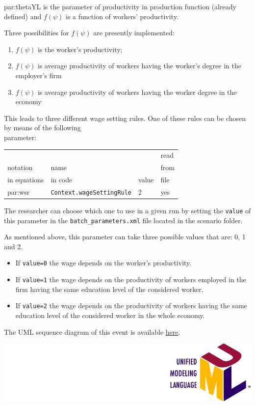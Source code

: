 \documentclass{book}
\newcommand{\doclocation}{file:///Users/giulioni/Documents/workspace/gabriele/docs}
\begin{document}
\vskip2mm
\gls{par:thetaYL} is the parameter of productivity in production function (already defined) and $f(\psi)$ is a function of workers' productivity.

Three possibilities for $f(\psi)$ are presently implemented:
\begin{enumerate}
	\item $f(\psi)$ is the worker's productivity;
	\item $f(\psi)$ is average productivity of workers having the worker's degree in the employer's firm
	\item $f(\psi)$ is average productivity of workers having the worker degree in the economy
\end{enumerate}


This leads to three different wage setting rules. One of these rules can be chosen by means of the following\\
parameter:\\
\vskip2mm
\noindent
\begin{tabular}{l l l l}
	\hline
	& &&read\\
	notation& name &&from\\
	in equations& in code&value&file\\
	\hline
	\hline
\gls{par:wsr}&\verb+Context.wageSettingRule+&2&yes\\
	\hline
\end{tabular}

\vskip2mm
The researcher can choose which one to use in a given run by setting the \verb+value+ of this parameter in the \verb+batch_parameters.xml+ file located in the scenario folder.

As mentioned above, this parameter can take three possible values that are: 0, 1 and 2.

\begin{itemize}
	\item 
		If \verb+value=0+ the wage depends on the worker's productivity.
	\item 
		If \verb+value=1+ the wage depends on the productivity of workers employed in the firm having the same education level of the considered worker.
	\item 
		If \verb+value=2+ the wage depends on the productivity of workers having the same education level of the considered worker in the whole economy.

\end{itemize}

The UML sequence diagram of this event is available \href{\doclocation/umldoc/setWorkersWage.html}{here}.
\begin{marginfigure}
	\includegraphics[scale=0.1]{uml.png}
\end{marginfigure}
\end{document}
